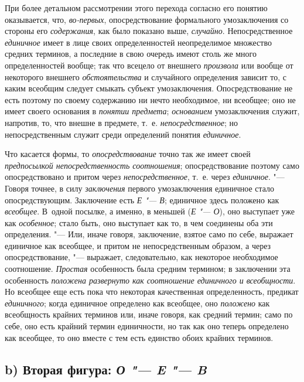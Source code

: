 При более детальном рассмотрении этого перехода согласно его
понятию оказывается, что,
{\em во-первых},
опосредствование формального умозаключения со стороны его
{\em содержания}, как
было показано выше, {\em случайно}.
Непосредственное
{\em единичное} имеет в
лице своих определенностей неопределимое множество средних терминов, а
последние в свою очередь имеют столь же много определенностей вообще; так
что всецело от внешнего {\em произвола}
или вообще от некоторого внешнего
{\em обстоятельства} и
случайного определения зависит то, с каким всеобщим следует смыкать субъект
умозаключения. Опосредствование не есть поэтому по своему содержанию ни
нечто необходимое, ни всеобщее; оно не имеет своего основания в
{\em понятии предмета};
{\em основанием}
умозаключения служит, напротив, то, что внешне в предмете,
т.~е. {\em непосредственное};
но непосредственным служит среди определений понятия
{\em единичное}.

Что касается формы, то
{\em опосредствование}
точно так же имеет своей
{\em предпосылкой непосредственность
соотношения}; опосредствование поэтому само опосредствовано
и притом через {\em непосредственное},
т.~е. через
{\em единичное}. "--- Говоря
точнее, в силу {\em заключения}
первого умозаключения единичное стало опосредствующим.
Заключение есть {\em Е
"--- В}; единичное здесь положено как
{\em всеобщее}. В~одной
посылке, а именно, в меньшей ({\em Е
"--- О}), оно выступает уже как
{\em особенное}; стало
быть, оно выступает как то, в чем соединены оба эти определения. "---
Или, иначе говоря, заключение, взятое само по себе, выражает
единичное как всеобщее, и притом не непосредственным образом, а через
опосредствование, "--- выражает, следовательно, как некоторое
необходимое соотношение. {\em Простая}
особенность была средним термином; в заключении эта
особенность {\em положена развернуто как
соотношение единичного и всеобщности}. Но всеобщее еще есть
пока что некоторая качественная определенность, предикат
{\em единичного}; когда
единичное определено как всеобщее, оно
{\em положено} как
всеобщность крайних терминов или, иначе говоря, как средний термин; само по
себе, оно есть крайний термин единичности, но так как оно теперь определено
как всеобщее, то оно вместе с тем есть единство обоих крайних терминов.

\subsection[b) Вторая фигура]
{b) Вторая фигура: {\em О "--- E "--- B}}

